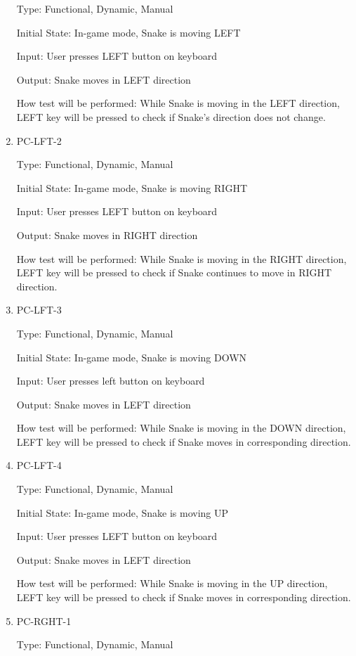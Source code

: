 \documentclass[12pt, titlepage]{article}
\begin{document}
\begin{enumerate}
Type: Functional, Dynamic, Manual

Initial State: In-game mode, Snake is moving LEFT

Input: User presses LEFT button on keyboard

Output: Snake moves in LEFT direction

How test will be performed: While Snake is moving in the LEFT direction, LEFT key will be pressed to check if Snake's direction does not change.

\item{PC-LFT-2}
\label{pc-lft-2}

Type: Functional, Dynamic, Manual

Initial State: In-game mode, Snake is moving RIGHT

Input: User presses LEFT button on keyboard

Output: Snake moves in RIGHT direction

How test will be performed: While Snake is moving in the RIGHT direction, LEFT key will be pressed to check if Snake continues to move in RIGHT direction.

\item{PC-LFT-3}
\label{pc-lft-3}

Type: Functional, Dynamic, Manual

Initial State: In-game mode, Snake is moving DOWN

Input: User presses left button on keyboard

Output: Snake moves in LEFT direction

How test will be performed: While Snake is moving in the DOWN direction, LEFT key will be pressed to check if Snake moves in corresponding direction.

\item{PC-LFT-4}
\label{pc-lft-4}

Type: Functional, Dynamic, Manual

Initial State: In-game mode, Snake is moving UP

Input: User presses LEFT button on keyboard

Output: Snake moves in LEFT direction

How test will be performed: While Snake is moving in the UP direction, LEFT key will be pressed to check if Snake moves in corresponding direction.

\item{PC-RGHT-1}
\label{pc-rght-1}

Type: Functional, Dynamic, Manual


\end{enumerate}
\end{document}
